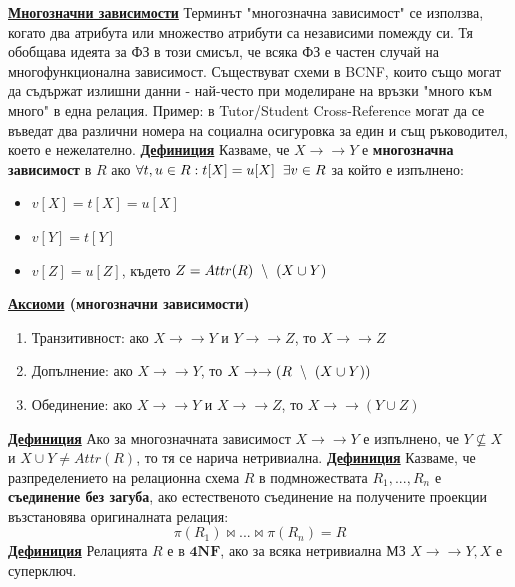 \documentclass{article}
\begin{document}
\textbf{\underline{Многозначни зависимости}} \newline\newline
Терминът "многозначна зависимост" се използва, когато два атрибута или множество атрибути са независими помежду си. Тя обобщава идеята за ФЗ
в този смисъл, че всяка ФЗ е частен случай на многофункционална зависимост. Съществуват схеми в BCNF, които също могат да съдържат излишни данни -
най-често при моделиране на връзки "много към много" в една релация. Пример: в Tutor/Student Cross-Reference могат да се въведат два различни
номера на социална осигуровка за един и същ ръководител, което е нежелателно. \newline\newline
\textbf{\underline{Дефиниция}}
Казваме, че $X \rightarrow\rightarrow Y$ е \textbf{многозначна зависимост} в $R$ ако $\forall t, u \in R : t[X] = u[X] \hspace{0.2cm} \exists v \in R$ за
който е изпълнено:
\begin{itemize}
    \item $v[X] = t[X] = u[X]$
    \item $v[Y] = t[Y]$
    \item $v[Z] = u[Z]$, където $Z = Attr(R) \hspace{0.2cm} \backslash \hspace{0.2cm} (X \cup Y)$
\end{itemize}
\textbf{\underline{Аксиоми} (многозначни зависимости)}
\begin{enumerate}
    \item Транзитивност: ако $X \rightarrow\rightarrow Y$ и $Y \rightarrow\rightarrow Z$, то $X \rightarrow\rightarrow Z$
    \item Допълнение: ако $X \rightarrow\rightarrow Y$, то $X \rightarrow\rightarrow (R \hspace{0.2cm} \backslash \hspace{0.2cm} (X \cup Y))$
    \item Обединение: ако $X \rightarrow\rightarrow Y$ и $X \rightarrow\rightarrow Z$, то $X \rightarrow\rightarrow (Y \cup Z)$
\end{enumerate}
\textbf{\underline{Дефиниция}}
Ако за многозначната зависимост $X \rightarrow\rightarrow Y$ е изпълнено, че $Y \nsubseteq X$ и $X \cup Y \neq Attr(R)$, то тя се нарича
нетривиална. \newline\newline
\textbf{\underline{Дефиниция}}
Казваме, че разпределението на релационна схема $R$ в подмножествата $R_1, ..., R_n$ е \textbf{съединение без загуба}, ако естественото
съединение на получените проекции възстановява оригиналната релация: $$\pi(R_1) \bowtie ... \bowtie \pi(R_n) = R$$
\textbf{\underline{Дефиниция}}
Релацията $R$ е в $\mathbf{4NF}$, ако за всяка нетривиална МЗ $X \rightarrow\rightarrow Y, X$ е суперключ.  
\end{document}
